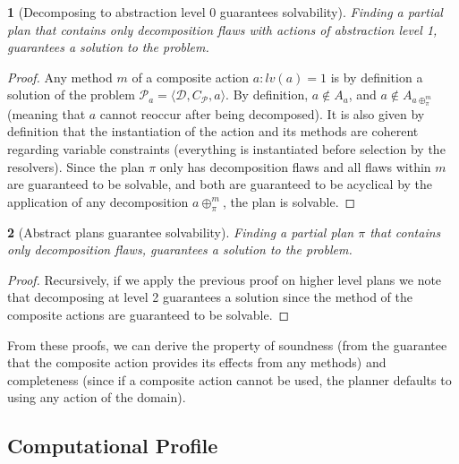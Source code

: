 \documentclass[11pt,a4paper,twoside,openright,titlepage,numbers=noenddot,headinclude,cleardoublepage=empty,openany]{scrreprt}
\theoremstyle{plain}
\newtheorem*{lemma}{\capitalisewords{lemma}}
\theoremstyle{definition}
\theoremstyle{remark}
\begin{document}
\begin{lemma}[Decomposing to abstraction level 0 guarantees solvability]

Finding a partial plan that contains only decomposition flaws with
actions of abstraction level 1, guarantees a solution to the problem.

\end{lemma}

\begin{proof}

Any method \(m\) of a composite action \(a: lv(a) = 1\) is by definition
a solution of the problem
\(\mathcal{P}_a = \langle \mathcal{D}, C_{\mathcal{P}} , a\rangle\). By
definition, \(a \notin A_a\), and \(a \notin A_{a \oplus^m_\pi}\)
(meaning that \(a\) cannot reoccur after being decomposed). It is also
given by definition that the instantiation of the action and its methods
are coherent regarding variable constraints (everything is instantiated
before selection by the resolvers). Since the plan \(\pi\) only has
decomposition flaws and all flaws within \(m\) are guaranteed to be
solvable, and both are guaranteed to be acyclical by the application of
any decomposition \(a \oplus^m_\pi\), the plan is solvable.

\end{proof}

\begin{lemma}[Abstract plans guarantee solvability]

Finding a partial plan \(\pi\) that contains only decomposition flaws,
guarantees a solution to the problem.

\end{lemma}

\begin{proof}

Recursively, if we apply the previous proof on higher level plans we
note that decomposing at level 2 guarantees a solution since the method
of the composite actions are guaranteed to be solvable.

\end{proof}

From these proofs, we can derive the property of soundness (from the
guarantee that the composite action provides its effects from any
methods) and completeness (since if a composite action cannot be used,
the planner defaults to using any action of the domain).

\hypertarget{computational-profile}{%
\subsection{Computational Profile}\label{computational-profile}}
\end{document}

